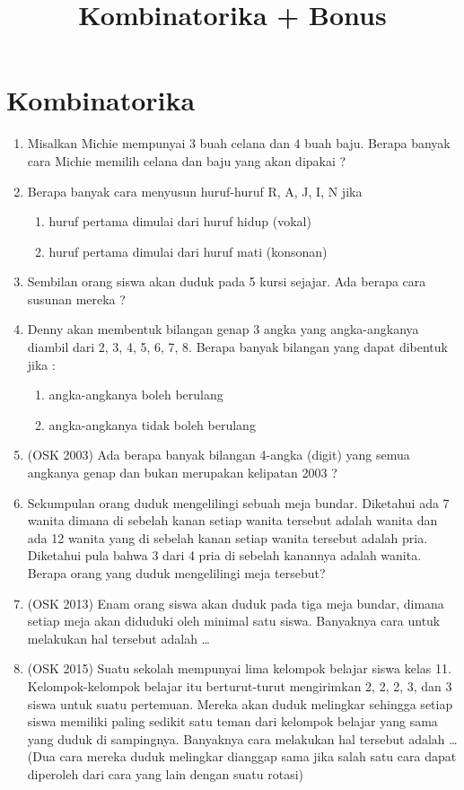 \documentclass[12pt]{scrartcl}
\title{Kombinatorika + Bonus}
\begin{document}
\section{Kombinatorika}
\begin{enumerate}
    \item Misalkan Michie mempunyai 3 buah celana dan 4 buah baju. Berapa banyak cara Michie memilih celana dan baju yang akan dipakai ?

    \item Berapa banyak cara menyusun huruf-huruf R, A, J, I, N jika 
    \begin{enumerate}
        \item huruf pertama dimulai dari huruf hidup (vokal) 
        \item huruf pertama dimulai dari huruf mati (konsonan) 
    \end{enumerate}

    \item Sembilan orang siswa akan duduk pada 5 kursi sejajar. Ada berapa cara susunan mereka ? 
    
    \item Denny akan membentuk bilangan genap 3 angka yang angka-angkanya diambil dari 2, 3, 4, 5, 6, 7, 8. Berapa banyak bilangan yang dapat dibentuk jika : 
    \begin{enumerate}
        \item angka-angkanya boleh berulang 
        \item angka-angkanya tidak boleh berulang
    \end{enumerate}

    \item (OSK 2003) Ada berapa banyak bilangan 4-angka (digit) yang semua angkanya genap dan bukan merupakan kelipatan 2003 ?

    \item Sekumpulan orang duduk mengelilingi sebuah meja bundar. Diketahui ada 7 wanita dimana di sebelah kanan setiap wanita tersebut adalah wanita dan ada 12 wanita yang di sebelah kanan setiap wanita tersebut adalah pria. Diketahui pula bahwa 3 dari 4 pria di sebelah kanannya adalah wanita. Berapa orang yang duduk mengelilingi meja tersebut?

    \item (OSK 2013) Enam orang siswa akan duduk pada tiga meja bundar, dimana setiap meja akan diduduki oleh minimal satu siswa. Banyaknya cara untuk melakukan hal tersebut adalah \ldots

    \item (OSK 2015) Suatu sekolah mempunyai lima kelompok belajar siswa kelas 11. Kelompok-kelompok belajar itu berturut-turut mengirimkan 2, 2, 2, 3, dan 3 siswa untuk suatu pertemuan. Mereka akan duduk melingkar sehingga setiap siswa memiliki paling sedikit satu teman dari kelompok belajar yang sama yang duduk di sampingnya. Banyaknya cara melakukan hal tersebut adalah \ldots\\
    (Dua cara mereka duduk melingkar dianggap sama jika salah satu cara dapat diperoleh dari cara yang lain dengan suatu rotasi)


\end{enumerate}
\end{document}
